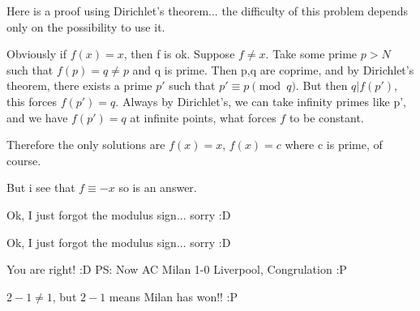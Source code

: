 \begin{solution}
	Here is a proof using Dirichlet's theorem... the difficulty of this problem depends only on the possibility to use it.

Obviously if $f(x) = x$, then f is ok.
Suppose $f \neq x$. Take some prime $p > N$ such that $f(p) = q \neq p$ and q is prime. Then p,q are coprime, and by Dirichlet's theorem, there exists a prime $p'$ such that $p' \equiv p \pmod q$. But then $q | f(p')$, this forces $f(p') =q$. Always by Dirichlet's, we can take infinity primes like p', and we have $f(p') = q$ at infinite points, what forces $f$ to be constant.

Therefore the only solutions are $f(x) = x$, $f(x) = c$ where c is prime, of course.
\end{solution}



\begin{solution}
	But i see that $f\equiv-x$ so is an answer.
\end{solution}



\begin{solution}
	Ok, I just forgot the modulus sign... sorry  :D
\end{solution}



\begin{solution}
	\begin{tcolorbox}Ok, I just forgot the modulus sign... sorry  :D\end{tcolorbox}
You are right! :D 
P\/S: Now AC Milan 1-0 Liverpool, Congrulation :P
\end{solution}



\begin{solution}
	$2-1 \neq 1$, but $2-1$ means Milan has won!!  :P
\end{solution}



